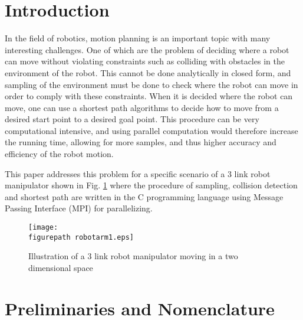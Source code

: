 
\newcommand{\figurepath}{./figures/}
\newcommand{\figurescale}{0.6}
\newcommand{\codepath}{../matlab/}





\section{\textbf{Introduction}}

In the field of robotics, motion planning is an important topic with many interesting challenges. One of which are the problem of deciding where a robot can move without violating constraints such as colliding with obstacles in the environment of the robot. This cannot be done analytically in closed form, and sampling of the environment must be done to check where the robot can move in order to comply with these constraints. When it is decided where the robot can move, one can use a shortest path algorithms to decide how to move from a desired start point to a desired goal point. This procedure can be very computational intensive, and using parallel computation would therefore increase the running time, allowing for more samples, and thus higher accuracy and efficiency of the robot motion.
\\  \par
This paper addresses this problem for a specific scenario of a 3 link robot manipulator shown in Fig. \ref{fig:robot1} where the procedure of sampling, collision detection and shortest path are written in the C programming language using Message Passing Interface (MPI) for parallelizing. 

\begin{figure}[h!] 
 \center 
 \texttt{[image: \\figurepath robotarm1.eps]}
 \caption{ Illustration of a 3 link robot manipulator moving in a two dimensional space \label{fig:robot1}}
 \end{figure}



\section{\textbf{Preliminaries and Nomenclature}}

